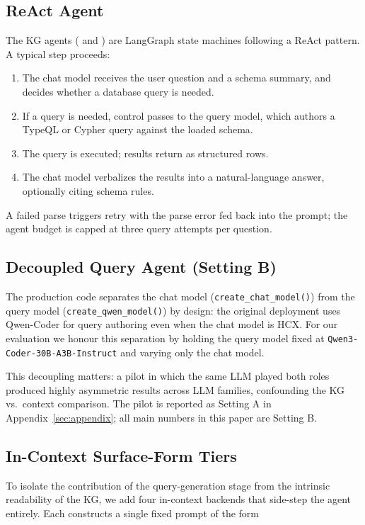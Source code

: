 \subsection{ReAct Agent}

The KG agents ( and ) are
LangGraph state machines following a ReAct pattern. A typical step
proceeds:

\begin{enumerate}
\item The chat model receives the user question and a schema
      summary, and decides whether a database query is needed.
\item If a query is needed, control passes to the query model, which
      authors a TypeQL or Cypher query against the loaded schema.
\item The query is executed; results return as structured rows.
\item The chat model verbalizes the results into a natural-language
      answer, optionally citing schema rules.
\end{enumerate}

A failed parse triggers retry with the parse error fed back into the
prompt; the agent budget is capped at three query attempts per
question.

\subsection{Decoupled Query Agent (Setting B)}

The production code separates the chat model
(\texttt{create\_chat\_model()}) from the query model
(\texttt{create\_qwen\_model()}) by design: the original deployment
uses Qwen-Coder for query authoring even when the chat model is HCX.
For our evaluation we honour this separation by holding the query
model fixed at \texttt{Qwen3-Coder-30B-A3B-Instruct} and varying only
the chat model.

This decoupling matters: a pilot in which the same LLM played both
roles produced highly asymmetric results across LLM families,
confounding the KG vs.\ context comparison. The pilot is reported as
Setting A in Appendix~\ref{sec:appendix}; all main numbers in this
paper are Setting B.

\subsection{In-Context Surface-Form Tiers}

To isolate the contribution of the query-generation stage from the
intrinsic readability of the KG, we add four in-context backends that
side-step the agent entirely. Each constructs a single fixed prompt
of the form

